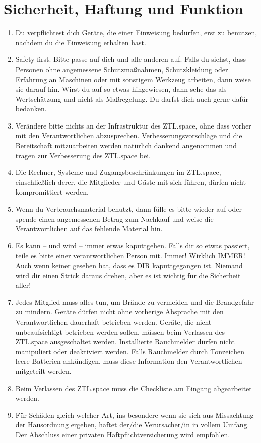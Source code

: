 \documentclass[a4paper, 12pt, numbers=withenddot,]{scrartcl}
\begin{document}
\newpage

\section{Sicherheit, Haftung und Funktion}
\begin{enumerate}[label=\alph*)]
	\item Du verpflichtest dich Geräte, die einer Einweisung bedürfen, erst zu benutzen,
nachdem du die Einweisung erhalten hast.
	\item Safety first. Bitte passe auf dich und alle anderen auf. Falls du siehst, dass
Personen ohne angemessene Schutzmaßnahmen, Schutzkleidung oder
Erfahrung an Maschinen oder mit sonstigem Werkzeug arbeiten, dann weise sie
darauf hin. Wirst du auf so etwas hingewiesen, dann sehe das als Wertschätzung
und nicht als Maßregelung. Du darfst dich auch gerne dafür bedanken.
	\item  Verändere bitte nichts an der Infrastruktur des ZTL.space, ohne dass vorher mit
den Verantwortlichen abzusprechen. Verbesserungsvorschläge und die
Bereitschaft mitzuarbeiten werden natürlich dankend angenommen und tragen zur
Verbesserung des ZTL.space bei.
	\item Die Rechner, Systeme und Zugangsbeschränkungen im ZTL.space, einschließlich
derer, die Mitglieder und Gäste mit sich führen, dürfen nicht kompromittiert werden.
	\item  Wenn du Verbrauchsmaterial benutzt, dann fülle es bitte wieder auf oder spende
einen angemessenen Betrag zum Nachkauf und weise die Verantwortlichen auf
das fehlende Material hin.
	\item Es kann – und wird – immer etwas kaputtgehen. Falls dir so etwas passiert, teile
es bitte einer verantwortlichen Person mit. Immer! Wirklich IMMER! Auch wenn
keiner gesehen hat, dass es DIR kaputtgegangen ist. Niemand wird dir einen Strick
daraus drehen, aber es ist wichtig für die Sicherheit aller!
	\item Jedes Mitglied muss alles tun, um Brände zu vermeiden und die Brandgefahr zu
mindern. Geräte dürfen nicht ohne vorherige Absprache mit den Verantwortlichen
dauerhaft betrieben werden. Geräte, die nicht unbeaufsichtigt betrieben werden
sollen, müssen beim Verlassen des ZTL.space ausgeschaltet werden. Installierte
Rauchmelder dürfen nicht manipuliert oder deaktiviert werden. Falls Rauchmelder
durch Tonzeichen leere Batterien ankündigen, muss diese Information den
Verantwortlichen mitgeteilt werden.
	\item Beim Verlassen des ZTL.space muss die Checkliste am Eingang abgearbeitet
werden.
	\item Für Schäden gleich welcher Art, ins besondere wenn sie sich aus Missachtung der
Hausordnung ergeben, haftet der/die Verursacher/in in vollem Umfang. Der
Abschluss einer privaten Haftpflichtversicherung wird empfohlen.
\end{enumerate}
\end{document}

